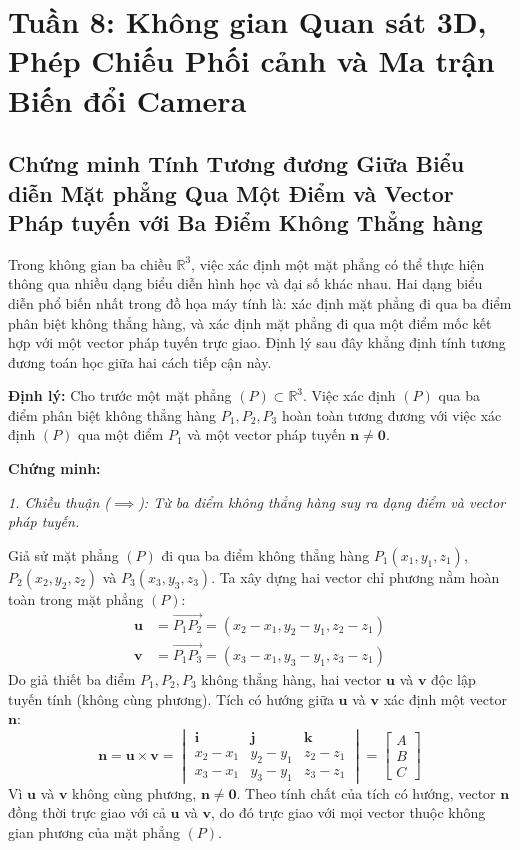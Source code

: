 \section{Tuần 8: Không gian Quan sát 3D, Phép Chiếu Phối cảnh và Ma trận Biến đổi Camera}
\label{sec:week8}

\subsection{Chứng minh Tính Tương đương Giữa Biểu diễn Mặt phẳng Qua Một Điểm và Vector Pháp tuyến với Ba Điểm Không Thẳng hàng}
\label{subsec:plane_point_normal_vs_three_points}

Trong không gian ba chiều $\mathbb{R}^3$, việc xác định một mặt phẳng có thể thực hiện thông qua nhiều dạng biểu diễn hình học và đại số khác nhau. Hai dạng biểu diễn phổ biến nhất trong đồ họa máy tính là: xác định mặt phẳng đi qua ba điểm phân biệt không thẳng hàng, và xác định mặt phẳng đi qua một điểm mốc kết hợp với một vector pháp tuyến trực giao. Định lý sau đây khẳng định tính tương đương toán học giữa hai cách tiếp cận này.

\textbf{Định lý:} Cho trước một mặt phẳng $(P) \subset \mathbb{R}^3$. Việc xác định $(P)$ qua ba điểm phân biệt không thẳng hàng $P_1, P_2, P_3$ hoàn toàn tương đương với việc xác định $(P)$ qua một điểm $P_1$ và một vector pháp tuyến $\mathbf{n} \neq \mathbf{0}$.

\textbf{Chứng minh:}

\textit{1. Chiều thuận ($\implies$): Từ ba điểm không thẳng hàng suy ra dạng điểm và vector pháp tuyến.}

Giả sử mặt phẳng $(P)$ đi qua ba điểm không thẳng hàng $P_1(x_1, y_1, z_1)$, $P_2(x_2, y_2, z_2)$ và $P_3(x_3, y_3, z_3)$. Ta xây dựng hai vector chỉ phương nằm hoàn toàn trong mặt phẳng $(P)$:
\begin{align}
\mathbf{u} &= \vec{P_1P_2} = (x_2 - x_1, y_2 - y_1, z_2 - z_1) \\
\mathbf{v} &= \vec{P_1P_3} = (x_3 - x_1, y_3 - y_1, z_3 - z_1)
\end{align}
Do giả thiết ba điểm $P_1, P_2, P_3$ không thẳng hàng, hai vector $\mathbf{u}$ và $\mathbf{v}$ độc lập tuyến tính (không cùng phương). Tích có hướng giữa $\mathbf{u}$ và $\mathbf{v}$ xác định một vector $\mathbf{n}$:
\begin{equation}
\label{eq:normal_from_three_points}
\mathbf{n} = \mathbf{u} \times \mathbf{v} = \begin{vmatrix}
\mathbf{i} & \mathbf{j} & \mathbf{k} \\
x_2 - x_1 & y_2 - y_1 & z_2 - z_1 \\
x_3 - x_1 & y_3 - y_1 & z_3 - z_1
\end{vmatrix} = \begin{bmatrix} A \\ B \\ C \end{bmatrix}
\end{equation}
Vì $\mathbf{u}$ và $\mathbf{v}$ không cùng phương, $\mathbf{n} \neq \mathbf{0}$. Theo tính chất của tích có hướng, vector $\mathbf{n}$ đồng thời trực giao với cả $\mathbf{u}$ và $\mathbf{v}$, do đó trực giao với mọi vector thuộc không gian phương của mặt phẳng $(P)$.

